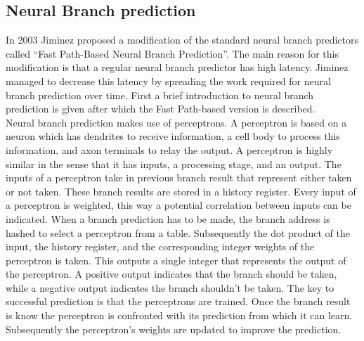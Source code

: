 \subsection{Neural Branch prediction}

In 2003 Jiminez \cite{neural} proposed a modification of the standard neural branch predictors called \enquote{Fast Path-Based Neural Branch Prediction}.
The main reason for this modification is that a regular neural branch predictor has high latency.
Jiminez managed to decrease this latency by spreading the work required for neural branch prediction over time.
First a brief introduction to neural branch prediction is given after which the Fast Path-based version is described.\\

Neural branch prediction makes use of perceptrons.
A perceptron is based on a neuron which has dendrites to receive information, a cell body to process this information, and axon terminals to relay the output.
A perceptron is highly similar in the sense that it has inputs, a processing stage, and an output.
The inputs of a perceptron take in previous branch result that represent either taken or not taken.
These branch results are stored in a history register.
Every input of a perceptron is weighted, this way a potential correlation between inputs can be indicated.
 When a branch prediction has to be made, the branch address is hashed to select a perceptron from a table.
Subsequently the dot product of the input, the history register, and the corresponding integer weights of the perceptron is taken.
This outputs a single integer that represents the output of the perceptron.
A positive output indicates that the branch should be taken, while a negative output indicates the branch shouldn't be taken.
The key to successful prediction is that the perceptrons are trained.
Once the branch result is know the perceptron is confronted with its prediction from which it can learn.
Subsequently the perceptron's weights are updated to improve the prediction.

